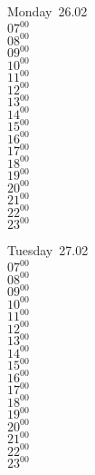 \documentclass[11pt, a4paper]{book}\usepackage[]{graphicx}\usepackage[]{color}
\begin{document}
\begin{headerbox}
\end{headerbox}
\begin{weekdaybox}
  Monday~26.02\\
  { 
  \vfill
  $07^{00}$\\
$08^{00}$\\
$09^{00}$\\
$10^{00}$\\
$11^{00}$\\
$12^{00}$\\
$13^{00}$\\
$14^{00}$\\
$15^{00}$\\
$16^{00}$\\
$17^{00}$\\
$18^{00}$\\
$19^{00}$\\
$20^{00}$\\
$21^{00}$\\
$22^{00}$\\
$23^{00}$\\
  }
\end{weekdaybox}
\begin{weekdaybox}
  Tuesday~27.02\\
  { 
  \vfill
  $07^{00}$\\
$08^{00}$\\
$09^{00}$\\
$10^{00}$\\
$11^{00}$\\
$12^{00}$\\
$13^{00}$\\
$14^{00}$\\
$15^{00}$\\
$16^{00}$\\
$17^{00}$\\
$18^{00}$\\
$19^{00}$\\
$20^{00}$\\
$21^{00}$\\
$22^{00}$\\
$23^{00}$\\
  }
\end{weekdaybox}
\end{document}
